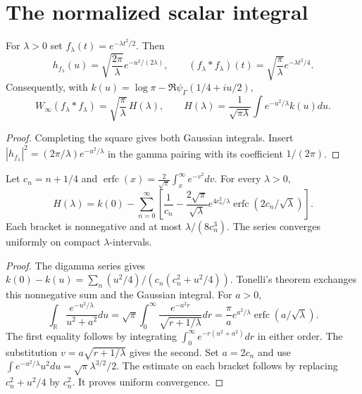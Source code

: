 \section{The normalized scalar integral}
\begin{lemma}
For $\lambda>0$ set $f_\lambda(t)=e^{-\lambda t^2/2}$. Then
\[
 h_{f_\lambda}(u)=\sqrt{\frac{2\pi}{\lambda}}
 e^{-u^2/(2\lambda)},\qquad
 (f_\lambda*f_\lambda)(t)=\sqrt{\frac\pi\lambda}
 e^{-\lambda t^2/4}.
\]
Consequently, with $k(u)=\log\pi-\Re\psi_\Gamma(1/4+iu/2)$,
\[
 W_\infty(f_\lambda*f_\lambda)
 =\sqrt{\frac\pi\lambda}\,H(\lambda),\qquad
 H(\lambda)=\frac1{\sqrt{\pi\lambda}}
             \int e^{-u^2/\lambda}k(u)du.
\]
\end{lemma}
\begin{proof}
Completing the square gives both Gaussian integrals.
Insert $|h_{f_\lambda}|^2=(2\pi/\lambda)e^{-u^2/\lambda}$
in the gamma pairing with its coefficient $1/(2\pi)$.
\end{proof}

\begin{theorem}
\label{v4-arith:sc:erfc}
Let $c_n=n+1/4$ and
$\operatorname{erfc}(x)=\frac2{\sqrt\pi}\int_x^\infty e^{-v^2}dv$.
For every $\lambda>0$,
\[
 H(\lambda)=k(0)-\sum_{n=0}^\infty
 \left[\frac1{c_n}-\frac{2\sqrt\pi}{\sqrt\lambda}
 e^{4c_n^2/\lambda}\operatorname{erfc}(2c_n/\sqrt\lambda)\right].
\]
Each bracket is nonnegative and at most $\lambda/(8c_n^3)$.
The series converges uniformly on compact $\lambda$-intervals.
\end{theorem}
\begin{proof}
The digamma series gives
$k(0)-k(u)=\sum_n (u^2/4)/(c_n(c_n^2+u^2/4))$.
Tonelli's theorem exchanges this nonnegative sum and the Gaussian
integral. For $a>0$,
\[
 \int_{\mathbb R}\frac{e^{-u^2/\lambda}}{u^2+a^2}du
 =\sqrt\pi\int_0^\infty\frac{e^{-a^2r}}{\sqrt{r+1/\lambda}}dr
 =\frac\pi a e^{a^2/\lambda}\operatorname{erfc}(a/\sqrt\lambda).
\]
The first equality follows by integrating
$\int_0^\infty e^{-r(u^2+a^2)}dr$ in either order.
The substitution $v=a\sqrt{r+1/\lambda}$ gives the second.
Set $a=2c_n$ and use
$\int e^{-u^2/\lambda}u^2du=\sqrt\pi\lambda^{3/2}/2$.
The estimate on each bracket follows by replacing
$c_n^2+u^2/4$ by $c_n^2$. It proves uniform convergence.
\end{proof}

